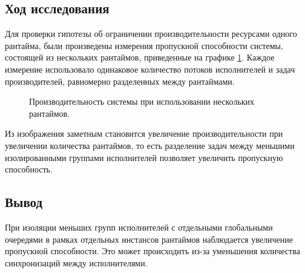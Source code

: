 \subsection{Ход исследования}

Для проверки гипотезы об ограничении производительности ресурсами одного рантайма, были произведены измерения пропускной способности системы, состоящей из нескольких рантаймов, приведенные на графике \ref{fig:tatlin:multi_rt:eval}. Каждое измерение использовало одинаковое количество потоков исполнителей и задач производителей, равномерно разделенных между рантаймами.

\begin{figure}[H]
    \begin{center}
    \end{center}

    \caption{Производительность системы при использовании нескольких рантаймов.}
    \label{fig:tatlin:multi_rt:eval}
\end{figure}

Из изображения заметным становится увеличение производительности при увеличении количества рантаймов, то есть разделение задач между меньшими изолированными группами исполнителей позволяет увеличить пропускную способность.

\subsection{Вывод}

При изоляции меньших групп исполнителей с отдельными глобальными очередями в рамках отдельных инстансов рантаймов наблюдается увеличение пропускной способности. Это может происходить из-за уменьшения количества синхронизаций между исполнителями.

